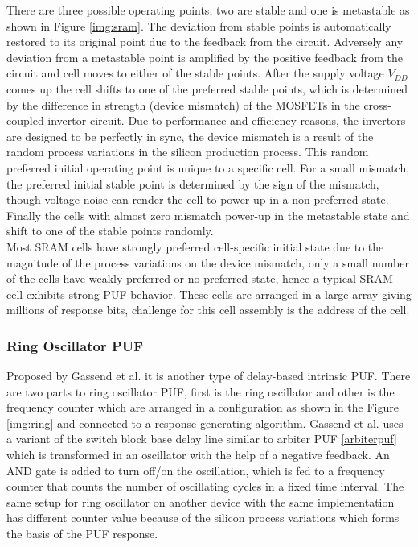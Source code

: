 There are three possible operating points, two are stable and one is metastable as shown in Figure \ref{img:sram}. The deviation from stable points is automatically restored to its original point due to the feedback from the circuit. Adversely any deviation from a metastable point is amplified by the positive feedback from the circuit and cell moves to either of the stable points. After the supply voltage $V_{DD}$ comes up the cell shifts to one of the preferred stable points, which is determined by the difference in
strength (device mismatch) of the MOSFETs in the cross-coupled invertor circuit. Due to performance and efficiency reasons, the invertors are designed to be perfectly in sync, the device mismatch is a result of the random process variations in the silicon production process. This random preferred initial operating point is unique to a specific cell. For a small mismatch, the preferred initial stable point is determined by the sign of the mismatch, though voltage noise can render the cell to
power-up in a non-preferred state. Finally the cells with almost zero mismatch power-up in the metastable state and shift to one of the stable points randomly.\\

Most SRAM cells have strongly preferred cell-specific initial state due to the magnitude of the process variations on the device mismatch, only a small number of the cells have weakly preferred or no preferred state, hence a typical SRAM cell exhibits strong PUF behavior. These cells are arranged in a large array giving millions of response bits, challenge for this cell assembly is the address of the cell.\\

\subsubsection{Ring Oscillator PUF}

Proposed by Gassend et al. \cite{21} it is another type of delay-based intrinsic PUF. There are two parts to ring oscillator PUF, first is the ring oscillator and other is the frequency counter which are arranged in a configuration as shown in the Figure \ref{img:ring} and connected to a response generating algorithm. Gassend et al. uses a variant of the switch block base delay line similar to arbiter PUF \ref{arbiterpuf} which is transformed in an oscillator with the help of a negative feedback.
An AND gate is added to turn off/on the oscillation, which is fed to a frequency counter that counts the number of oscillating cycles in a fixed time interval. The same setup for ring oscillator on another device with the same implementation has different counter value because of the silicon process variations which forms the basis of the PUF response.\\

